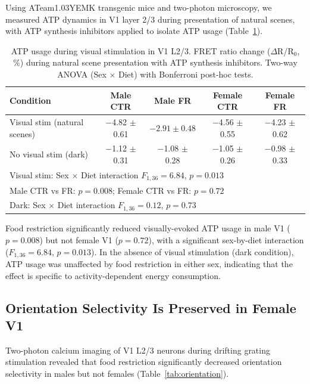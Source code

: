 \documentclass[11pt]{article}
\begin{document}
Using ATeam1.03YEMK transgenic mice and two-photon microscopy, we measured ATP dynamics in V1 layer 2/3 during presentation of natural scenes, with ATP synthesis inhibitors applied to isolate ATP usage (Table~\ref{tab:atp}).

\begin{table}[H]
\centering
\caption{ATP usage during visual stimulation in V1 L2/3. FRET ratio change ($\Delta$R/R$_0$, \%) during natural scene presentation with ATP synthesis inhibitors. Two-way ANOVA (Sex $\times$ Diet) with Bonferroni post-hoc tests.}
\label{tab:atp}
\begin{tabular}{lcccc}
\toprule
Condition & Male CTR & Male FR & Female CTR & Female FR \\
\midrule
Visual stim (natural scenes) & $-$4.82 $\pm$ 0.61 & $\mathbf{-2.91 \pm 0.48}$ & $-$4.56 $\pm$ 0.55 & $-$4.23 $\pm$ 0.62 \\
No visual stim (dark) & $-$1.12 $\pm$ 0.31 & $-$1.08 $\pm$ 0.28 & $-$1.05 $\pm$ 0.26 & $-$0.98 $\pm$ 0.33 \\
\midrule
\multicolumn{5}{l}{Visual stim: Sex $\times$ Diet interaction $F_{1,36} = 6.84$, $p = 0.013$} \\
\multicolumn{5}{l}{Male CTR vs FR: $p = 0.008$; Female CTR vs FR: $p = 0.72$} \\
\multicolumn{5}{l}{Dark: Sex $\times$ Diet interaction $F_{1,36} = 0.12$, $p = 0.73$} \\
\bottomrule
\end{tabular}
\end{table}

Food restriction significantly reduced visually-evoked ATP usage in male V1 ($p = 0.008$) but not female V1 ($p = 0.72$), with a significant sex-by-diet interaction ($F_{1,36} = 6.84$, $p = 0.013$). In the absence of visual stimulation (dark condition), ATP usage was unaffected by food restriction in either sex, indicating that the effect is specific to activity-dependent energy consumption.

\subsection{Orientation Selectivity Is Preserved in Female V1}

Two-photon calcium imaging of V1 L2/3 neurons during drifting grating stimulation revealed that food restriction significantly decreased orientation selectivity in males but not females (Table~\ref{tab:orientation}).
\end{document}
